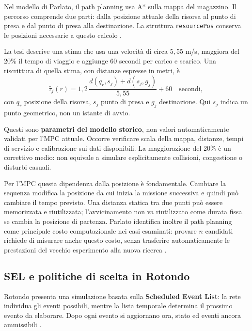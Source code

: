\documentclass[a4paper,11pt]{article}
\begin{document}
Nel modello di Parlato, il path planning usa A* sulla mappa del magazzino. Il percorso comprende due parti: dalla posizione attuale della risorsa al punto di presa e dal punto di presa alla destinazione. La struttura \texttt{resourcePos} conserva le posizioni necessarie a questo calcolo \cite[sezione 2.4.1, pp. 24--30]{Parlato}.

La tesi descrive una stima che usa una velocità di circa $5{,}55$ m/s, maggiora del 20\% il tempo di viaggio e aggiunge 60 secondi per carico e scarico. Una riscrittura di quella stima, con distanze espresse in metri, è
\begin{equation}
    \widehat\tau_j(r)
    =1{,}2\,\frac{d(q_r,s_j)+d(s_j,g_j)}{5{,}55}
      +60\quad\text{secondi},
\end{equation}
con $q_r$ posizione della risorsa, $s_j$ punto di presa e $g_j$ destinazione. Qui $s_j$ indica un punto geometrico, non un istante di avvio.

Questi sono \textbf{parametri del modello storico}, non valori automaticamente validati per l'MPC attuale. Occorre verificare scala della mappa, distanze, tempi di servizio e calibrazione sui dati disponibili. La maggiorazione del 20\% è un correttivo medio: non equivale a simulare esplicitamente collisioni, congestione o disturbi casuali.

Per l'MPC questa dipendenza dalla posizione è fondamentale. Cambiare la sequenza modifica la posizione da cui inizia la missione successiva e quindi può cambiare il tempo previsto. Una distanza statica tra due punti può essere memorizzata e riutilizzata; l'avvicinamento non va riutilizzato come durata fissa se cambia la posizione di partenza. Parlato identifica inoltre il path planning come principale costo computazionale nei casi esaminati: provare $n$ candidati richiede di misurare anche questo costo, senza trasferire automaticamente le prestazioni del vecchio esperimento alla nuova ricerca \cite[sezioni 2.4.1 e 3.6]{Parlato}.

\subsection{SEL e politiche di scelta in Rotondo}

Rotondo presenta una simulazione basata sulla \textbf{Scheduled Event List}: la rete individua gli eventi possibili, mentre la lista temporale determina il prossimo evento da elaborare. Dopo ogni evento si aggiornano ora, stato ed eventi ancora ammissibili \cite[sezione 2.3, pp. 10--11]{Rotondo}.
\end{document}

